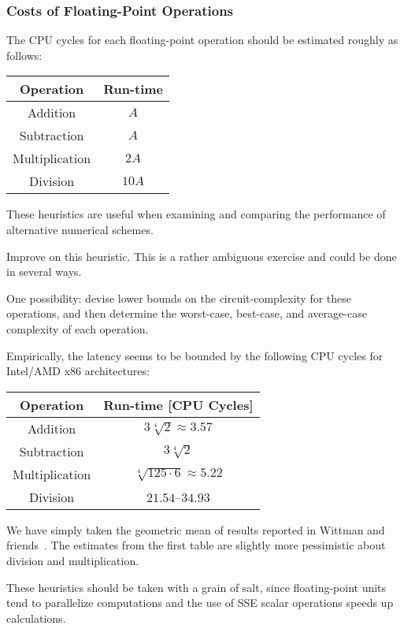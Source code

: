 \subsubsection{Costs of Floating-Point Operations}
\begin{heuristic}
  The CPU cycles for each floating-point operation should be estimated
  roughly as follows:
  \begin{center}
  \begin{tabular}{c|c}
    Operation & Run-time\\\hline
    Addition & $A$ \\
    Subtraction & $A$ \\
    Multiplication & $2A$ \\
    Division & $10A$
  \end{tabular}
  \end{center}
  These heuristics are useful when examining and comparing the
  performance of alternative numerical schemes.
\end{heuristic}
\begin{xca}
  Improve on this heuristic. This is a rather ambiguous exercise and
  could be done in several ways.
  
  One possibility: devise lower bounds on the circuit-complexity for
  these operations, and then determine the worst-case, best-case, and
  average-case complexity of each operation.
\end{xca}
\begin{ex}[x86-64 Estimates]
  Empirically, the latency seems to be bounded by the following CPU
  cycles for Intel/AMD x86 architectures:
  \begin{center}
  \begin{tabular}{c|c}
    Operation & Run-time [CPU Cycles]\\\hline
    Addition & $3 \sqrt[4]{2}\approx 3.57$ \\
    Subtraction &  $3\sqrt[4]{2}$ \\
    Multiplication & $\sqrt[4]{125\cdot 6}\approx5.22$ \\
    Division & $21.54$--$34.93$
  \end{tabular}
  \end{center}
  We have simply taken the geometric mean of results reported in Wittman
  and friends~\cite{DBLP:journals/corr/WittmannZHW15}. The estimates
  from the first table are slightly more pessimistic about division and
  multiplication.

  These heuristics should be taken with a grain of salt, since
  floating-point units tend to parallelize computations and the use of
  SSE scalar operations speeds up calculations.
\end{ex}

